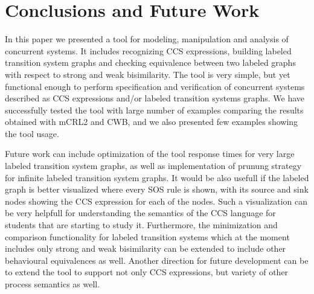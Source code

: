 \section{Conclusions and Future Work}
\label{sec:conclusion}

In this paper we presented a tool for modeling, manipulation and analysis of concurrent systems. It includes recognizing CCS expressions, building labeled transition system graphs and checking equivalence between two labeled graphs with respect to strong and weak bisimilarity. The tool is very simple, but yet functional enough to perform specification and verification of concurrent systems described as CCS expressions and/or labeled transition systems graphs. We have successfully tested the tool with large number of examples comparing the results obtained with mCRL2 and CWB, and we also presented few examples showing the tool usage. 

Future work can include optimization of the tool response times for very large labeled transition system graphs, as well as implementation of prunung strategy for infinite labeled transition system graphs. It would be also usefull if the labeled graph is better visualized where every SOS rule is shown, with its source and sink nodes showing the CCS expression for each of the nodes. Such a visualization can be very helpfull for understanding the semantics of the CCS language for students that are starting to study it. Furthermore, the minimization and comparison functionality for labeled transition systems which at the moment includes only strong and weak bisimilarity can be extended to include other behavioural equivalences as well. Another direction for future development can be to extend the tool to support not only CCS expressions, but variety of other process semantics as well. 
